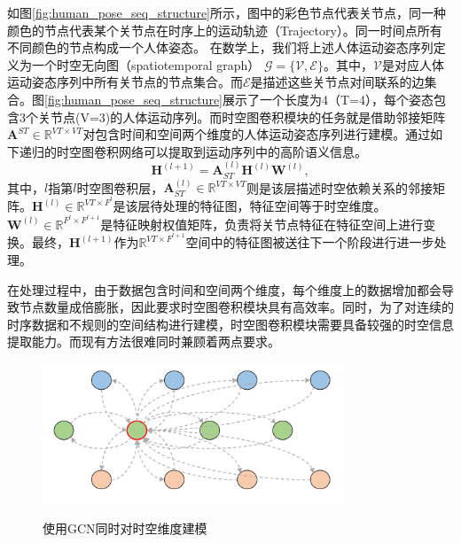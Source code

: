 如图\ref{fig:human_pose_seq_structure}所示，图中的彩色节点代表关节点，同一种颜色的节点代表某个关节点在时序上的运动轨迹（Trajectory）。同一时间点所有不同颜色的节点构成一个人体姿态。
在数学上，我们将上述人体运动姿态序列定义为一个时空无向图（spatiotemporal graph） $\mathcal{G} = \{\mathcal{V,E}\}$。其中，$\mathcal{V}$是对应人体运动姿态序列中所有关节点的节点集合。而$\mathcal{E}$是描述这些关节点对间联系的边集合。图\ref{fig:human_pose_seq_structure}展示了一个长度为4（T=4），每个姿态包含3个关节点(V=3)的人体运动序列。而时空图卷积模块的任务就是借助邻接矩阵$\mathbf{A}^{ST} \in \mathbb{R}^{VT\times VT}$对包含时间和空间两个维度的人体运动姿态序列进行建模。通过如下递归的时空图卷积网络可以提取到运动序列中的高阶语义信息。
\begin{equation}
    \mathbf{H}^{(l+1)}= \mathbf{A}_{ST}^{(l)}\mathbf{H}^{(l)}\mathbf{W}^{(l)},
    \label{equation:graph-conv}
\end{equation}
其中，$l$指第$l$时空图卷积层，$\mathbf{A}_{ST}^{(l)}\in \mathbb{R}^{VT\times VT}$则是该层描述时空依赖关系的邻接矩阵。$\mathbf{H}^{(l)}\in \mathbb{R}^{VT\times F^l}$是该层待处理的特征图，特征空间等于时空维度。$\mathbf{W}^{(l)}\in \mathbb{R}^{F^l\times F^{l+1}}$是特征映射权值矩阵，负责将关节点特征在特征空间上进行变换。最终，$\mathbf{H}^{(l+1)}$作为$\mathbb{R}^{VT\times F^{l+1}}$空间中的特征图被送往下一个阶段进行进一步处理。

在处理过程中，由于数据包含时间和空间两个维度，每个维度上的数据增加都会导致节点数量成倍膨胀，因此要求时空图卷积模块具有高效率。同时，为了对连续的时序数据和不规则的空间结构进行建模，时空图卷积模块需要具备较强的时空信息提取能力。而现有方法很难同时兼顾着两点要求。

\begin{figure}[ht]
    \centering
    \includegraphics[width=0.80\textwidth]{FigMa/original_gcn.png}\\
    \vspace{-0.3cm}
    \caption{使用GCN同时对时空维度建模}
    \label{fig:original_gcn_structure}
\end{figure}

